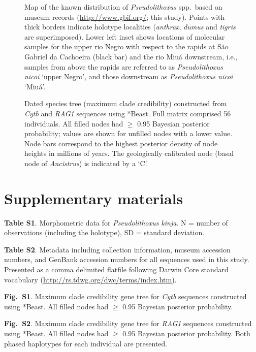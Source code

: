 \documentclass[12pt]{article}
\begin{document}
\begin{figure}[!htbp]
\caption{Map of the known distribution of \emph{Pseudolithoxus} spp.\ based on museum records (\href{http://www.gbif.org/}{http://www.gbif.org/}; this study). %
Points with thick borders indicate holotype localities (\emph{anthrax}, \emph{dumus} and \emph{tigris} are superimposed). %
 Lower left inset shows locations of molecular samples for the upper rio Negro with respect to the rapids at São Gabriel da Cachoeira (black bar) and the rio Miuá downstream, i.e., samples from above the rapids are referred to as \emph{Pseudolithoxus nicoi} `upper Negro', and those downstream as \emph{Pseudolithoxus nicoi} `Miuá'.}
\begin{center}
\end{center}
\label{fig:map}
\end{figure}

\begin{figure}[!htbp]
\caption{Dated species tree (maximum clade credibility) constructed from \emph{Cytb} and \emph{RAG1} sequences using *Beast. %
Full matrix comprised 56 individuals. %
All filled nodes had $\geq$ 0.95 Bayesian posterior probability; values are shown for unfilled nodes with a lower value. %
Node bars correspond to the highest posterior density of node heights in millions of years. %
The geologically calibrated node (basal node of \emph{Ancistrus}) is indicated by a `C'.}
\begin{center}
\end{center}
\label{fig:tree}
\end{figure}



\newpage
\section*{Supplementary materials}

\noindent \textbf{Table S1}. Morphometric data for \emph{Pseudolithoxus kinja}. %
N = number of observations (including the holotype), SD = standard deviation.%
\bigskip

\noindent \textbf{Table S2}. Metadata including collection information, museum accession numbers, and GenBank accession numbers for all sequences used in this study. Presented as a comma delimited flatfile following Darwin Core standard vocabulary (\href{http://rs.tdwg.org/dwc/terms/index.htm}{http://rs.tdwg.org/dwc/terms/index.htm}).%
\bigskip

\noindent \textbf{Fig.\ S1}. Maximum clade credibility gene tree for \emph{Cytb} sequences constructed using *Beast. %
All filled nodes had $\geq$ 0.95 Bayesian posterior probability.%
\bigskip

\noindent \textbf{Fig.\ S2}. Maximum clade credibility gene tree for \emph{RAG1} sequences constructed using *Beast. %
All filled nodes had $\geq$ 0.95 Bayesian posterior probability. %
Both phased haplotypes for each individual are presented.%
\bigskip
\newpage 

\clearpage
\end{document}
